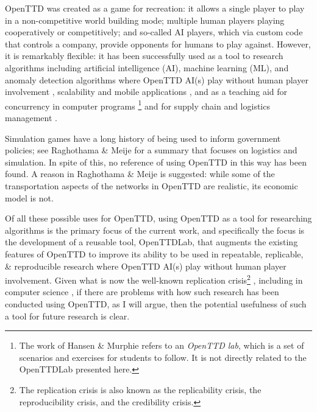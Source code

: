 \documentclass[logo,msc,dsti]{style/infthesis}    %
\newcommand{\singlespacedfootnote}[1]{{\singlespace\footnote{#1}}}
\begin{document}
OpenTTD was created as a game for recreation: it allows a single player to play in a non-competitive world building mode; multiple human players playing cooperatively or competitively; and so-called AI players, which via custom code that controls a company, provide opponents for humans to play against. However, it is remarkably flexible: it has been successfully used as a tool to research algorithms including artificial intelligence (AI), machine learning (ML), and anomaly detection algorithms where OpenTTD AI(s) play without human player involvement \cite{beuneker2019autonomous, bijlsma2014evolving, konijnendijk2015mcts, lakomy2020railroad, rios2009trains, wisniewski2011artificial, volna2017fuzzy}, scalability and mobile applications \cite{jiang2018mirroring}, and as a teaching aid for concurrency in computer programs \cite{HansenMuprhie2018, marmorstein2015teaching}\singlespacedfootnote{The work of Hansen \& Murphie \cite{HansenMuprhie2018} refers to an \emph{OpenTTD lab}, which is a set of scenarios and exercises for students to follow. It is not directly related to the OpenTTDLab presented here.} and for supply chain and logistics management \cite{doi:10.1080/10494820.2016.1242503}.

Simulation games have a long history of being used to inform government policies; see Raghothama \& Meije \cite{raghothama2013review} for a summary that focuses on logistics and simulation. In spite of this, no reference of using OpenTTD in this way has been found. A reason in  Raghothama \& Meije \cite{raghothama2013review} is suggested: while some of the transportation aspects of the networks in OpenTTD are realistic, its economic model is not.

Of all these possible uses for OpenTTD, using OpenTTD as a tool for researching algorithms is the primary focus of the current work, and specifically the focus is the development of a reusable tool, OpenTTDLab, that augments the existing features of OpenTTD to improve its ability to be used in repeatable, replicable, \& reproducible research where OpenTTD AI(s) play without human player involvement. Given what is now the well-known replication crisis\singlespacedfootnote{The replication crisis is also known as the replicability crisis, the reproducibility crisis, and the credibility crisis.} \cite{ioannidis2005most, baker20161}, including in computer science \cite{dalle2012reproducibility, CollbergChristianProebsting2016}, if there are problems with how such research has been conducted using OpenTTD, as I will argue, then the potential usefulness of such a tool for future research is clear.
\end{document}
